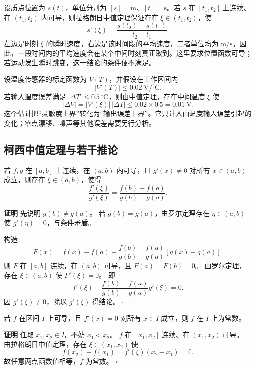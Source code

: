 \documentclass[fontset=fandol]{ctexart}
\newenvironment{proofdetail}{\par\noindent\textbf{证明}\quad}{\hfill$\square$\par\vspace{0.8em}}
\begin{document}
\begin{application}[物理：平均速度与瞬时速度]
设质点位置为 $s(t)$，单位分别为 $[s]=\mathrm m$、$[t]=\mathrm s$。若 $s$ 在 $[t_1,t_2]$ 上连续、在 $(t_1,t_2)$ 内可导，则拉格朗日中值定理保证存在 $\xi\in(t_1,t_2)$，使
\[
s'(\xi)=\frac{s(t_2)-s(t_1)}{t_2-t_1}.
\]
左边是时刻 $\xi$ 的瞬时速度，右边是该时间段的平均速度，二者单位均为 $\mathrm{m/s}$。因此，一段时间内的平均速度会在某个中间时刻真正取到。这里要求位置函数可导；若运动发生瞬时跳变，这一结论的条件便不满足。
\end{application}

\begin{application}[工程：传感器误差上界]
设温度传感器的标定函数为 $V(T)$，并假设在工作区间内
\[
|V'(T)|\leq0.02\ \mathrm{V/^{\circ}C}.
\]
若输入温度误差满足 $|\Delta T|\leq0.5\,^{\circ}\mathrm C$，则由中值定理，存在中间温度 $\xi$ 使
\[
|\Delta V|=|V'(\xi)|\,|\Delta T|
\leq0.02\times0.5
=0.01\ \mathrm V.
\]
这个估计把“灵敏度上界”转化为“输出误差上界”。它只计入由温度输入误差引起的变化；零点漂移、噪声等其他误差需要另行分析。
\end{application}

\subsection{柯西中值定理与若干推论}

\begin{theorem}[柯西中值定理]
若 $f,g$ 在 $[a,b]$ 上连续，在 $(a,b)$ 内可导，且 $g'(x)\neq0$ 对所有 $x\in(a,b)$ 成立，则存在 $\xi\in(a,b)$，使得
\[
\frac{f'(\xi)}{g'(\xi)}=\frac{f(b)-f(a)}{g(b)-g(a)}.
\]
\end{theorem}
\begin{proofdetail}
先说明 $g(b)\neq g(a)$。 若 $g(b)=g(a)$，由罗尔定理存在 $\eta\in(a,b)$ 使 $g'(\eta)=0$，与条件矛盾。

构造
\[
F(x)=f(x)-f(a)-\frac{f(b)-f(a)}{g(b)-g(a)}[g(x)-g(a)].
\]
则 $F$ 在 $[a,b]$ 连续，在 $(a,b)$ 可导，且 $F(a)=F(b)=0$。 由罗尔定理，存在 $\xi\in(a,b)$ 使 $F'(\xi)=0$。 即
\[
f'(\xi)-\frac{f(b)-f(a)}{g(b)-g(a)}g'(\xi)=0.
\]
因 $g'(\xi)\neq0$，除以 $g'(\xi)$ 得结论。
\end{proofdetail}

\begin{proposition}[导数恒为零的函数为常数]
若 $f$ 在区间 $I$ 上可导，且 $f'(x)=0$ 对所有 $x\in I$ 成立，则 $f$ 在 $I$ 上为常数。
\end{proposition}
\begin{proofdetail}
任取 $x_1,x_2\in I$，不妨 $x_1<x_2$。 $f$ 在 $[x_1,x_2]$ 连续、在 $(x_1,x_2)$ 可导。 由拉格朗日中值定理，存在 $\xi\in(x_1,x_2)$ 使
\[
f(x_2)-f(x_1)=f'(\xi)(x_2-x_1)=0.
\]
故任意两点函数值相等，$f$ 为常数。
\end{proofdetail}
\end{document}
